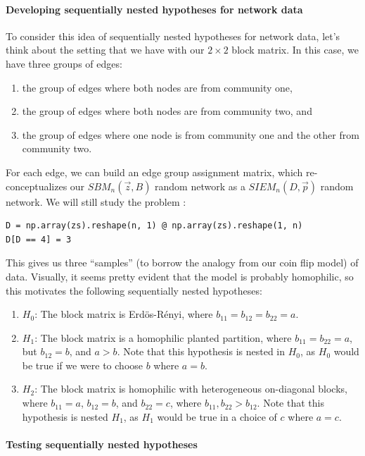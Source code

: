 \paragraph*{Developing sequentially nested hypotheses for network data}

To consider this idea of sequentially nested hypotheses for network data, let's think about the setting that we have with our $2 \times 2$ block matrix. In this case, we have three groups of edges: 
\begin{enumerate}
    \item the group of edges where both nodes are from community one,
    \item the group of edges where both nodes are from community two, and 
    \item the group of edges where one node is from community one and the other from community two.
\end{enumerate}
For each edge, we can build an edge group assignment matrix, which re-conceptualizes our $SBM_n(\vec z, B)$ random network as a $SIEM_n(D, \vec p)$ random network. We will still study the problem :

\begin{lstlisting}[style=python]
D = np.array(zs).reshape(n, 1) @ np.array(zs).reshape(1, n)
D[D == 4] = 3
\end{lstlisting}

This gives us three ``samples'' (to borrow the analogy from our coin flip model) of data. Visually, it seems pretty evident that the model is probably homophilic, so this motivates the following sequentially nested hypotheses:
\begin{enumerate}
    \item $H_0$: The block matrix is Erd\"os-R\'enyi, where $b_{11} = b_{12} = b_{22} = a$.
    \item $H_1$: The block matrix is a homophilic planted partition, where $b_{11} = b_{22} = a$, but $b_{12} = b$, and $a > b$. Note that this hypothesis is nested in $H_0$, as $H_0$ would be true if we were to choose $b$ where $a = b$.
    \item $H_2$: The block matrix is homophilic with heterogeneous on-diagonal blocks, where $b_{11} = a$, $b_{12} = b$, and $b_{22} = c$, where $b_{11}, b_{22} > b_{12}$. Note that this hypothesis is nested $H_1$, as $H_1$ would be true in a choice of $c$ where $a = c$.
\end{enumerate}


\paragraph*{Testing sequentially nested hypotheses}

